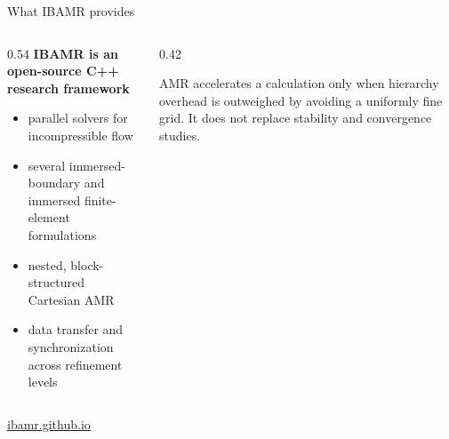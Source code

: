 \documentclass[aspectratio=169,11pt]{beamer}
\begin{document}
\begin{frame}{What IBAMR provides}
\begin{columns}[T,onlytextwidth]
\begin{column}{0.54\textwidth}
\textbf{IBAMR is an open-source C++ research framework}
\begin{itemize}\itemsep5pt
  \item parallel solvers for incompressible flow
  \item several immersed-boundary and immersed finite-element formulations
  \item nested, block-structured Cartesian AMR
  \item data transfer and synchronization across refinement levels
\end{itemize}
\end{column}
\begin{column}{0.42\textwidth}
\begin{punchbox}
\small AMR accelerates a calculation only when hierarchy overhead is outweighed by avoiding a uniformly fine grid. It does not replace stability and convergence studies.
\end{punchbox}
\end{column}
\end{columns}
\medskip
\centering
\href{https://ibamr.github.io}{ibamr.github.io}
\end{frame}
\end{document}
